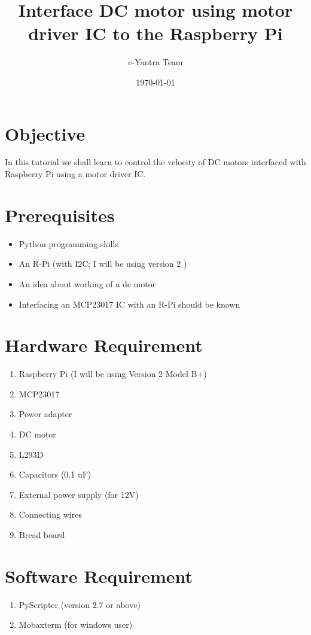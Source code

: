 \documentclass[11pt,a4paper]{article}
\title{Interface DC motor using motor driver IC to the Raspberry Pi }
\author{e-Yantra Team}
\date{\today}
\begin{document}
	\maketitle
	\newpage
	\tableofcontents
	\newpage
	\section{Objective}
	In this tutorial we shall learn to control the velocity of DC motors interfaced with Raspberry Pi using a motor driver IC.
	
	\section{Prerequisites}
	\begin{itemize}
		\item Python programming skills
		\item An R-Pi (with I2C; I will be using version 2 ) 
		\item An idea about working of a dc motor
		\item Interfacing an MCP23017 IC with an R-Pi should be known
	\end{itemize}
	
	\section{Hardware Requirement}
	\begin{enumerate}
		\item Raspberry Pi (I will be using Version 2 Model B+)
		\item MCP23017
		\item Power adapter
	    \item DC motor
	    \item L293D
	    \item Capacitors (0.1 uF)
	    \item External power supply (for 12V)
	    \item Connecting wires
		\item Bread board
	\end{enumerate}
	
	\section{Software Requirement}
	\begin{enumerate}
		\item PyScripter (version 2.7 or above)
		\item Mobaxterm (for windows user)
	\end{enumerate}
	
\end{document}
